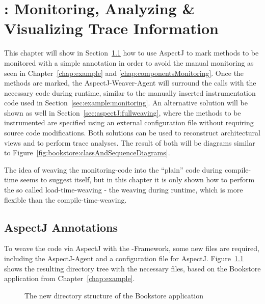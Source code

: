 % 

\chapter{\KiekerTraceAnalysis{}: Monitoring, Analyzing \& Visualizing Trace Information}\label{chap:aspectJ}

This chapter will show in Section~\ref{sec:aspectJ:annotation} how
to use AspectJ to mark methods to be monitored with a simple annotation
in order to avoid the manual monitoring as seen in Chapter~\ref{chap:example}
and \ref{chap:componentsMonitoring}. Once the methods are marked, the AspectJ-Weaver-Agent
will surround the calls with the necessary code during runtime, similar
to the manually inserted instrumentation code used in Section~\ref{sec:example:monitoring}.
An alternative solution will be shown as well in Section~\ref{sec:aspectJ:fullweaving}, %
where the methods to be instrumented are specified using an external configuration file %
without requiring source code modifications. Both solutions
can be used to reconstruct architectural views and to perform trace
analyses. The result of both will be diagrams similar to Figure~\ref{fig:bookstore:classAndSequenceDiagrams}.

The idea of weaving the monitoring-code into the ``plain'' code
during compile-time seems to suggest itself, but in this chapter it
is only shown how to perform the so called load-time-weaving - the
weaving during runtime, which is more flexible than the compile-time-weaving.

\section{AspectJ Annotations}\label{sec:aspectJ:annotation}

To weave the code via AspectJ with the \Kieker{}-Framework,
some new files are required, including the AspectJ-Agent and a configuration
file for AspectJ. Figure~\ref{fig:bookstoreAOP:dirStructure} shows the resulting %
directory tree with the necessary files, based on the Bookstore application from %
Chapter~\ref{chap:example}.

\begin{figure}[H]
\begin{graybox}
\end{graybox}

\caption{The new directory structure of the Bookstore application}
\label{fig:bookstoreAOP:dirStructure}
\end{figure}

